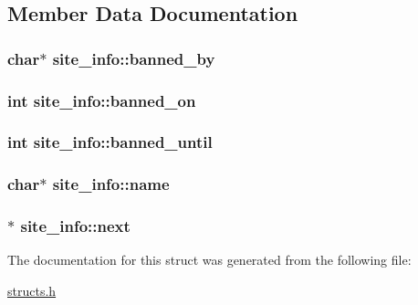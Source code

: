 \subsection{Member Data Documentation}
\hypertarget{structsite__info_a6e91d77e15687804e91f05ec61252162}{
\subsubsection[{banned\-\_\-by}]{\setlength{\rightskip}{0pt plus 5cm}char$\ast$ site\-\_\-info\-::banned\-\_\-by}}\label{structsite__info_a6e91d77e15687804e91f05ec61252162}
\hypertarget{structsite__info_abf2619a1a6c000e746ed8098e0a463ae}{
\subsubsection[{banned\-\_\-on}]{\setlength{\rightskip}{0pt plus 5cm}int site\-\_\-info\-::banned\-\_\-on}}\label{structsite__info_abf2619a1a6c000e746ed8098e0a463ae}
\hypertarget{structsite__info_af7c62b1c6c03b33ac1b853f398b3ab39}{
\subsubsection[{banned\-\_\-until}]{\setlength{\rightskip}{0pt plus 5cm}int site\-\_\-info\-::banned\-\_\-until}}\label{structsite__info_af7c62b1c6c03b33ac1b853f398b3ab39}
\hypertarget{structsite__info_aeb8333222942b254f8ec2cdb141c4136}{
\subsubsection[{name}]{\setlength{\rightskip}{0pt plus 5cm}char$\ast$ site\-\_\-info\-::name}}\label{structsite__info_aeb8333222942b254f8ec2cdb141c4136}
\hypertarget{structsite__info_a23c00a3e8306769f4e8c759762758617}{
\subsubsection[{next}]{$\ast$ site\-\_\-info\-::next}}\label{structsite__info_a23c00a3e8306769f4e8c759762758617}


The documentation for this struct was generated from the following file\-:\begin{DoxyCompactItemize}
\item 
\hyperlink{structs_8h}{structs.\-h}\end{DoxyCompactItemize}
